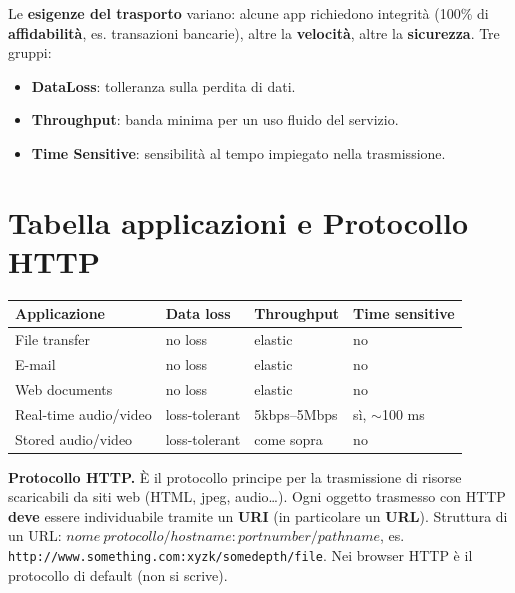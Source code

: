 \documentclass[11pt,a4paper]{report}
\newcommand{\pagemark}[1]{\marginpar{\footnotesize\color{gray}p.#1}}
\begin{document}
Le \textbf{esigenze del trasporto} variano: alcune app richiedono integrità (100\% di \textbf{affidabilità}, es. transazioni bancarie), altre la \textbf{velocità}, altre la \textbf{sicurezza}. Tre gruppi:
\begin{itemize}[noitemsep]
\item \textbf{DataLoss}: tolleranza sulla perdita di dati.
\item \textbf{Throughput}: banda minima per un uso fluido del servizio.
\item \textbf{Time Sensitive}: sensibilità al tempo impiegato nella trasmissione.
\end{itemize}

\section{Tabella applicazioni e Protocollo HTTP}\pagemark{32}
\begin{center}\footnotesize
\begin{tabular}{llll}
\textbf{Applicazione} & \textbf{Data loss} & \textbf{Throughput} & \textbf{Time sensitive}\\\hline
File transfer & no loss & elastic & no\\
E-mail & no loss & elastic & no\\
Web documents & no loss & elastic & no\\
Real-time audio/video & loss-tolerant & 5kbps--5Mbps & sì, $\sim$100 ms\\
Stored audio/video & loss-tolerant & come sopra & no\\
\end{tabular}
\end{center}

\textbf{Protocollo HTTP.} È il protocollo principe per la trasmissione di risorse scaricabili da siti web (HTML, jpeg, audio\dots). Ogni oggetto trasmesso con HTTP \textbf{deve} essere individuabile tramite un \textbf{URI} (in particolare un \textbf{URL}). Struttura di un URL: $nome\ protocollo / hostname{:}portnumber / pathname$, es. \texttt{http://www.something.com:xyzk/somedepth/file}. Nei browser HTTP è il protocollo di default (non si scrive).
\end{document}
